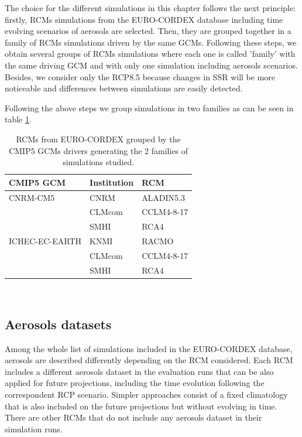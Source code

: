 The choice for the different simulations in this chapter follows the next principle: firstly, RCMs simulations from the EURO-CORDEX database including time evolving scenarios of aerosols are selected. Then, they are grouped together in a family of RCMs simulations driven by the same GCMs. Following these steps, we obtain several groups of RCMs simulations where each one is called 'family' with the same driving GCM and with only one simulation including aerosols scenarios. Besides, we consider only the RCP8.5 because changes in SSR will be more noticeable and differences between simulations are easily detected. 

Following the above steps we group simulations in two families as can be seen in table \ref{tb:families}.

\begin{table}[h]
\caption[RCMs from EURO-CORDEX grouped by the CMIP5 GCMs drivers generating the 2 families of simulations studied]{\label{tb:families}RCMs from EURO-CORDEX grouped by the CMIP5 GCMs drivers generating the 2 families of simulations studied.}
\footnotesize
\begin{tabular}{>{\raggedrigth}m{3cm}>{\raggedright}m{3cm}>{\raggedright}m{3cm}}
\toprule 
CMIP5 GCM & Institution  & RCM  \tabularnewline
\midrule
 CNRM-CM5 & CNRM & ALADIN5.3 \tabularnewline
&CLMcom&CCLM4-8-17\tabularnewline 
&SMHI&RCA4\tabularnewline
\midrule  
ICHEC-EC-EARTH&KNMI&RACMO\tabularnewline
&CLMcom&CCLM4-8-17\tabularnewline
&SMHI&RCA4\tabularnewline
\bottomrule
\end{tabular}\\
\end{table}
\normalsize



\subsection{Aerosols datasets}

Among the whole list of simulations included in the EURO-CORDEX database, aerosols are described differently depending on the RCM considered. Each RCM includes a different aerosols dataset in the evaluation runs that can be also applied for future projections, including the time evolution following the correspondent RCP scenario. Simpler approaches consist of a fixed climatology that is also included on the future projections but without evolving in time. There are other RCMs that do not include any aerosols dataset in their simulation runs.

